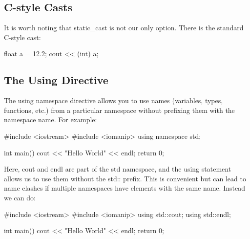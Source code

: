 \documentclass{report}
\begin{document}
    \bigbreak \noindent 
    \subsection{C-style Casts}
    \bigbreak \noindent 
    It is worth noting that static\_cast is not our only option. There is the standard C-style cast:
    \bigbreak \noindent 
    
    \begin{cppcode}
float a = 12.2;
cout << (int) a;
    \end{cppcode}
    
    




    \pagebreak
    \subsection{The Using Directive}
    \bigbreak \noindent 
    The using namespace directive allows you to use names (variables, types, functions, etc.) from a particular namespace without prefixing them with the namespace name. For example:
    \bigbreak \noindent 
    
    \begin{cppcode}
#include <iostream>
#include <iomanip>
using namespace std;

int main(){
    cout << "Hello World" << endl;
    return 0;
}
    \end{cppcode}
    
    \bigbreak \noindent 
    Here, cout and endl are part of the std namespace, and the using statement allows us to use them without the std:: prefix. This is convenient but can lead to name clashes if multiple namespaces have elements with the same name. Instead we can do:
    \bigbreak \noindent 
    
    \begin{cppcode}
#include <iostream>
#include <iomanip>
using std::cout;
using std::endl;

int main(){
    cout << "Hello World" << endl;
    return 0;
}
    \end{cppcode}
    
\end{document}

